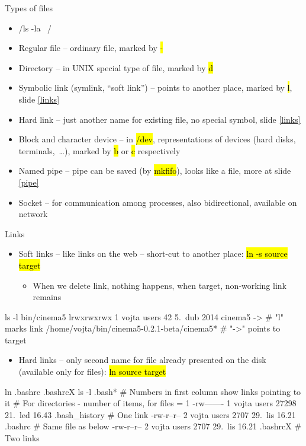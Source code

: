\documentclass[compress, ucs, xelatex, 11pt, xcolor=svgnames,
  hyperref={
    bookmarks=true,
    unicode=true,
    colorlinks=true,
    pdftitle={Linux, command line and MetaCentrum},
    plainpages=false,
    pdfauthor={Vojtech Zeisek},
    pdfsubject={Course about use of Linux command line, writing shell scripts and using MetaCentrum of CESNET},
    pdfcreator={XeLaTeX},
    pdfkeywords={Linux, GNU, BASH, shell, command line, MetaCentrum},
    linkcolor=DarkRed,
    anchorcolor=DarkBlue,
    citecolor=Indigo,
    filecolor=NavyBlue,
    menucolor=DarkMagenta,
    urlcolor=DarkBlue,
    pdftex},
  url={hyphens, lowtilde} %
  ]{beamer}
\renewcommand{\texttt}[1]{\hl{\ttfamily #1}}
\begin{document}
\begin{frame}{Types of files}
  \begin{itemize}
    \item \bash/ls -la ~/
    \item Regular file -- ordinary file, marked by \texttt{-}
    \item Directory -- in UNIX special type of file, marked by \texttt{d}
    \item Symbolic link (symlink, ``soft link'') -- points to another place, marked by \texttt{l}, slide \ref{links}
    \item Hard link -- just another name for existing file, no special symbol, slide \ref{links}
    \item Block and character device -- in \texttt{/dev}, representations of devices (hard disks, terminals,~\ldots), marked by \texttt{b} or \texttt{c} respectively
    \item Named pipe -- pipe can be saved (by \texttt{mkfifo}), looks like a file, more at slide \ref{pipe}
    \item Socket -- for communication among processes, also bidirectional, available on network
  \end{itemize}
\end{frame}

\begin{frame}[fragile]{Links}
  \label{links}
  \begin{itemize}
    \item Soft links -- like links on the web -- short-cut to another place: \texttt{ln -s source target}
    \begin{itemize}
      \item When we delete link, nothing happens, when target, non-working link remains
    \end{itemize}
  \end{itemize}
  \begin{bashcode}
    ls -l bin/cinema5
    lrwxrwxrwx 1 vojta users 42 5. dub 2014 cinema5 -> # "l" marks link
      /home/vojta/bin/cinema5-0.2.1-beta/cinema5* # "->" points to target
  \end{bashcode}
  \begin{itemize}
    \item Hard links -- only second name for file already presented on the disk (available only for files): \texttt{ln source target}
  \end{itemize}
  \begin{bashcode}
    ln .bashrc .bashrcX
    ls -l .bash* # Numbers in first column show links pointing to it
                 # For directories - number of items, for files = 1
    -rw------- 1 vojta users 27298 21. led 16.43 .bash_history # One link
    -rw-r--r-- 2 vojta users  2707 29. lis 16.21 .bashrc # Same file as below
    -rw-r--r-- 2 vojta users  2707 29. lis 16.21 .bashrcX # Two links
  \end{bashcode}
\end{frame}
\end{document}
